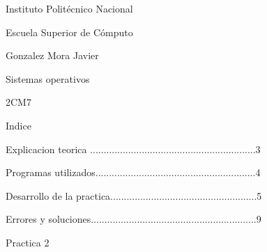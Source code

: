 \documentclass[12pt, a4paper]{report}
\begin{document}
\begin{LARGE}
\begin{center}

Instituto Politécnico Nacional

\bigskip
\bigskip

Escuela Superior de Cómputo

\bigskip
\bigskip

Gonzalez Mora Javier

\bigskip
\bigskip

Sistemas operativos

\bigskip
\bigskip

2CM7


\end{center}
\end{LARGE}

\newpage

\begin{center}

Indice

\end{center}

\bigskip
\bigskip

\begin{flushleft}
Explicacion teorica .............................................................3

\bigskip

Programas utilizados...........................................................4

\bigskip

Desarrollo de la practica......................................................5

\bigskip

Errores y soluciones.............................................................9

\bigskip

\end{flushleft}

\bigskip
\bigskip

\bigskip

\newpage




\begin{center}

Practica 2

\end{center}
\end{document}
